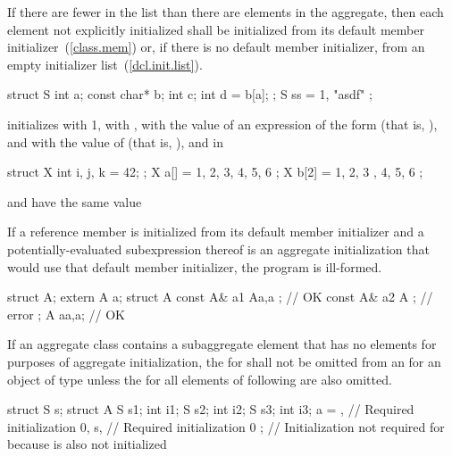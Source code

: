 \pnum
If there are fewer  in the list than there
are elements in the aggregate, then each element not explicitly initialized
shall be initialized from its default member initializer~(\ref{class.mem}) or,
if there is no default member initializer, from an empty
initializer list~(\ref{dcl.init.list}).
\begin{example}

\begin{codeblock}
struct S { int a; const char* b; int c; int d = b[a]; };
S ss = { 1, "asdf" };
\end{codeblock}

initializes
with 1,
with ,
with the value of an expression of the form
(that is, ), and  with the value of 
(that is, ), and in

\begin{codeblock}
struct X { int i, j, k = 42; };
X a[] = { 1, 2, 3, 4, 5, 6 };
X b[2] = { { 1, 2, 3 }, { 4, 5, 6 } };
\end{codeblock}

 and  have the same value
\end{example}

\pnum
If a reference member is initialized from its default member initializer
and a potentially-evaluated subexpression thereof is an aggregate
initialization that would use that default member initializer,
the program is ill-formed.
\begin{example}
\begin{codeblock}
  struct A;
  extern A a;
  struct A {
    const A& a1 { A{a,a} };   // OK
    const A& a2 { A{} };      // error
  };
  A a{a,a};                   // OK
\end{codeblock}
\end{example}

\pnum
If an aggregate class  contains a subaggregate element
 that has no elements for purposes of aggregate initialization,
the  for  shall not be
omitted from an  for an object of type
 unless the  for all
elements of  following  are also omitted.
\begin{example}

\begin{codeblock}
struct S { } s;
struct A {
  S s1;
  int i1;
  S s2;
  int i2;
  S s3;
  int i3;
} a = {
  { },      // Required initialization
  0,
  s,        // Required initialization
  0
};          // Initialization not required for  because  is also not initialized
\end{codeblock}
\end{example}

